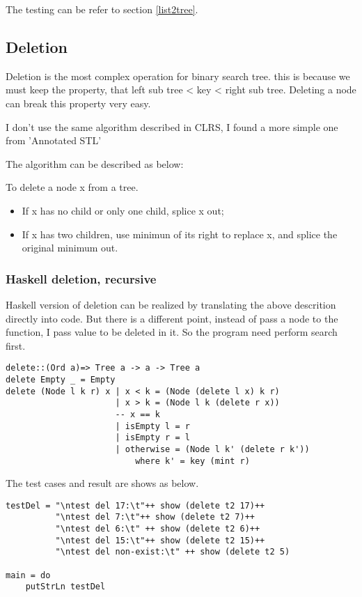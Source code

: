 \documentclass{article}
\begin{document}
The testing can be refer to section \ref{list2tree}.

\subsection{Deletion}
Deletion is the most complex operation for binary search tree. this is because we
must keep the property, that left sub tree < key < right sub tree. Deleting a node
can break this property very easy.

I don't use the same algorithm described in CLRS\cite{CLRS}, I found a more simple
one from 'Annotated STL'\cite{hj-stl}

The algorithm can be described as below:

To delete a node x from a tree.
\begin{itemize}
\item If x has no child or only one child, splice x out;
\item If x has two children, use minimun of its right to replace x, 
and splice the original minimum out.
\end{itemize}

\subsubsection*{Haskell deletion, recursive}

Haskell version of deletion can be realized by translating the above descrition
directly into code. But there is a different point, instead of pass a node to the
function, I pass value to be deleted in it. So the program need perform search first.

\lstset{language=Haskell}
\begin{lstlisting}
delete::(Ord a)=> Tree a -> a -> Tree a
delete Empty _ = Empty
delete (Node l k r) x | x < k = (Node (delete l x) k r)
                      | x > k = (Node l k (delete r x))
                      -- x == k
                      | isEmpty l = r
                      | isEmpty r = l
                      | otherwise = (Node l k' (delete r k')) 
                          where k' = key (mint r)
\end{lstlisting}

The test cases and result are shows as below.

\begin{lstlisting}
testDel = "\ntest del 17:\t"++ show (delete t2 17)++
          "\ntest del 7:\t"++ show (delete t2 7)++
          "\ntest del 6:\t" ++ show (delete t2 6)++
          "\ntest del 15:\t"++ show (delete t2 15)++
          "\ntest del non-exist:\t" ++ show (delete t2 5)

main = do
    putStrLn testDel
\end{lstlisting}
\end{document}
